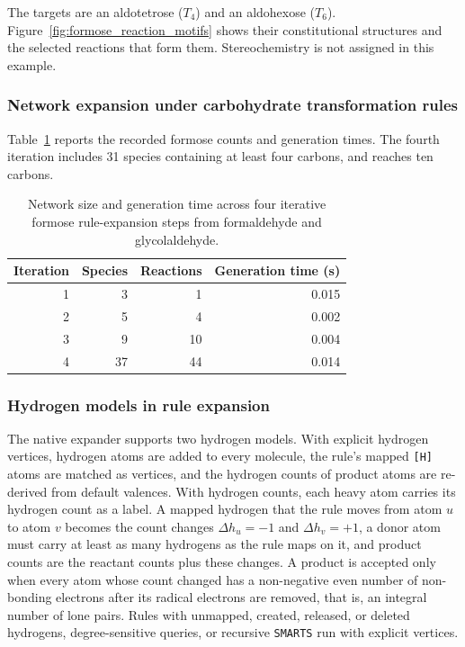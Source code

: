\documentclass[pdflatex,referee]{../template/sn-jnl}
\theoremstyle{plain}%
\theoremstyle{definition}%
\theoremstyle{remark}%
\begin{document}
The targets are an aldotetrose ($T_4$) and an aldohexose ($T_6$). Figure~\ref{fig:formose_reaction_motifs} shows their constitutional structures and the selected reactions that form them. Stereochemistry is not assigned in this example.

\subsubsection{Network expansion under carbohydrate transformation rules}

Table~\ref{tab:formose_growth} reports the recorded formose counts and generation times. The fourth iteration includes 31 species containing at least four carbons, and reaches ten carbons.

\begin{table}[htbp]
  \centering
  \caption{Network size and generation time across four iterative formose rule-expansion steps from formaldehyde and glycolaldehyde.}
  \label{tab:formose_growth}
  \scriptsize
  \setlength{\tabcolsep}{3.5pt}
  \begin{tabular}{rrrr}
  \toprule
  Iteration & Species & Reactions & Generation time (s) \\
  \midrule
1 & 3 & 1 & 0.015 \\
2 & 5 & 4 & 0.002 \\
3 & 9 & 10 & 0.004 \\
4 & 37 & 44 & 0.014 \\
\bottomrule
  \end{tabular}
\end{table}



\subsubsection{Hydrogen models in rule expansion}
\label{sec:si_hydrogen_models}

The native expander supports two hydrogen models. With explicit hydrogen vertices, hydrogen atoms are added to every molecule, the rule's mapped \texttt{[H]} atoms are matched as vertices, and the hydrogen counts of product atoms are re-derived from default valences. With hydrogen counts, each heavy atom carries its hydrogen count as a label. A mapped hydrogen that the rule moves from atom $u$ to atom $v$ becomes the count changes $\Delta h_u=-1$ and $\Delta h_v=+1$, a donor atom must carry at least as many hydrogens as the rule maps on it, and product counts are the reactant counts plus these changes. A product is accepted only when every atom whose count changed has a non-negative even number of non-bonding electrons after its radical electrons are removed, that is, an integral number of lone pairs. Rules with unmapped, created, released, or deleted hydrogens, degree-sensitive queries, or recursive \texttt{SMARTS} run with explicit vertices.
\end{document}
